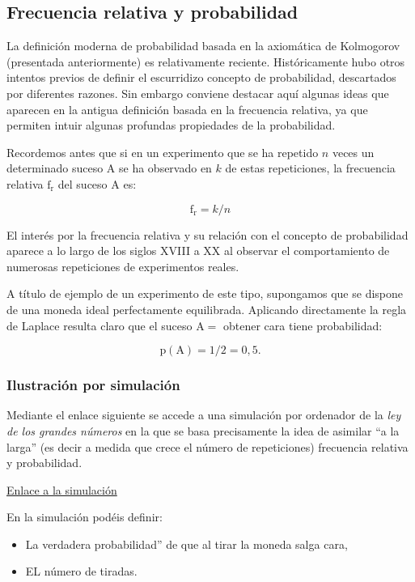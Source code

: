 \documentclass[
]{article}
\providecommand{\tightlist}{%
  \setlength{\itemsep}{0pt}\setlength{\parskip}{0pt}}
\begin{document}
\subsection{Frecuencia relativa y probabilidad}\label{frecuencia-relativa-y-probabilidad}

La definición moderna de probabilidad basada en la axiomática de
Kolmogorov (presentada anteriormente) es relativamente reciente.
Históricamente hubo otros intentos previos de definir el escurridizo
concepto de probabilidad, descartados por diferentes razones. Sin
embargo conviene destacar aquí algunas ideas que aparecen en la antigua
definición basada en la frecuencia relativa, ya que permiten intuir
algunas profundas propiedades de la probabilidad.

Recordemos antes que si en un experimento que se ha repetido \(n\) veces
un determinado suceso A se ha observado en \(k\) de estas repeticiones, la
frecuencia relativa \(\mathrm{f}_{\mathrm{r}}\) del suceso A es:

\[
\mathrm{f}_{\mathrm{r}}=k / n
\]

El interés por la frecuencia relativa y su relación con el concepto de
probabilidad aparece a lo largo de los siglos XVIII a XX al observar el
comportamiento de numerosas repeticiones de experimentos reales.

A título de ejemplo de un experimento de este tipo, supongamos que se
dispone de una moneda ideal perfectamente equilibrada. Aplicando
directamente la regla de Laplace resulta claro que el suceso
\(\mathrm{A}=\) obtener cara tiene probabilidad:

\[
\mathrm{p}(\mathrm{A})=1 / 2=0,5.
\]

\subsubsection{Ilustración por simulación}\label{ilustraciuxf3n-por-simulaciuxf3n}

Mediante el enlace siguiente se accede a una simulación por ordenador de la \emph{ley de los grandes números} en la que se basa precisamente la idea de asimilar ``a la larga'' (es decir a medida que crece el número de repeticiones) frecuencia relativa y probabilidad.

\href{https://www.grbio.eu/statmedia/Statmedia_1/}{Enlace a la simulación}

En la simulación podéis definir:

\begin{itemize}
\tightlist
\item
  La verdadera probabilidad'' de que al tirar la moneda salga cara,
\item
  EL número de tiradas.
\end{itemize}
\end{document}
